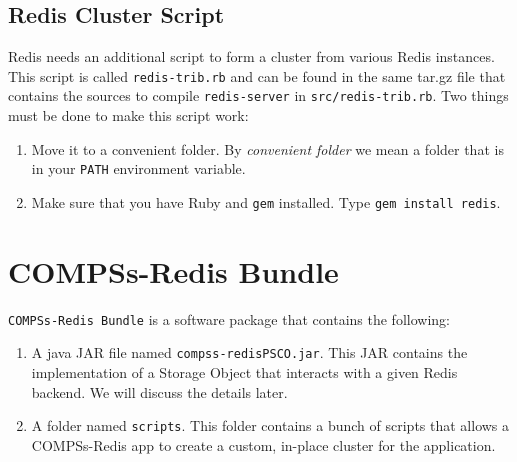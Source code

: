 \documentclass{article}
\begin{document}
\subsection{Redis Cluster Script}
Redis needs an additional script to form a cluster from various Redis instances. This script is called \verb|redis-trib.rb| and can be found in the same tar.gz file that contains the sources to compile \verb|redis-server| in \verb|src/redis-trib.rb|. Two things must be done to make this script work:
\begin{enumerate}
\item Move it to a convenient folder. By \textit{convenient folder} we mean a folder that is in your \verb|PATH| environment variable.
\item Make sure that you have Ruby and \verb|gem| installed. Type \verb|gem install redis|.
\end{enumerate}

\section{COMPSs-Redis Bundle}
\verb|COMPSs-Redis Bundle| is a software package that contains the following:
\begin{enumerate}
\item A java JAR file named \verb|compss-redisPSCO.jar|. This JAR contains the implementation of a Storage Object that interacts with a given Redis backend. We will discuss the details later.
\item A folder named \verb|scripts|. This folder contains a bunch of scripts that allows a COMPSs-Redis app to create a custom, in-place cluster  for the application.
\end{enumerate}
\end{document}
